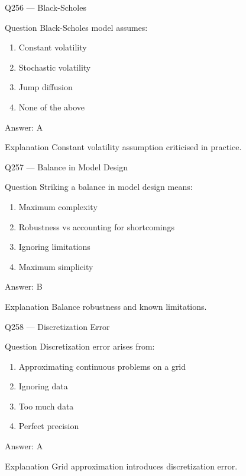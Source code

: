 \documentclass[aspectratio=169,8pt]{beamer}
\begin{document}
\begin{frame}{Q256 --- Black-Scholes}
\begin{block}{Question}
Black-Scholes model assumes:
\begin{enumerate}
\item Constant volatility
\item Stochastic volatility
\item Jump diffusion
\item None of the above
\end{enumerate}
\end{block}
\begin{exampleblock}{Answer: A}\end{exampleblock}
\begin{block}{Explanation}
Constant volatility assumption criticised in practice.
\end{block}
\end{frame}

\begin{frame}{Q257 --- Balance in Model Design}
\begin{block}{Question}
Striking a balance in model design means:
\begin{enumerate}
\item Maximum complexity
\item Robustness vs accounting for shortcomings
\item Ignoring limitations
\item Maximum simplicity
\end{enumerate}
\end{block}
\begin{exampleblock}{Answer: B}\end{exampleblock}
\begin{block}{Explanation}
Balance robustness and known limitations.
\end{block}
\end{frame}

\begin{frame}{Q258 --- Discretization Error}
\begin{block}{Question}
Discretization error arises from:
\begin{enumerate}
\item Approximating continuous problems on a grid
\item Ignoring data
\item Too much data
\item Perfect precision
\end{enumerate}
\end{block}
\begin{exampleblock}{Answer: A}\end{exampleblock}
\begin{block}{Explanation}
Grid approximation introduces discretization error.
\end{block}
\end{frame}
\end{document}
